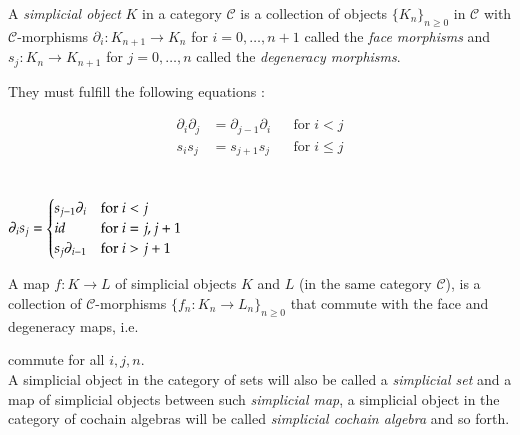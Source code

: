  \begin{Definition}
  A \emph{simplicial object} $K$ in a category $\mathscr{C}$
  is a collection of objects ${\lbrace K_n \rbrace}_{n \geq 0}$ in $\mathscr{C}$ with $\mathscr{C}$-morphisms
  $\partial_i \colon K_{n+1} \to K_n$ for $i = 0, \ldots, n+1$ called the \emph{face morphisms} and \newline
  $s_j \colon K_n \to K_{n+1}$ for $j = 0, \ldots, n$ called the \emph{degeneracy morphisms}.
  
  They must fulfill the following equations : 
%     
    \begin{multicols}{2}
     \begin{align*}
      \partial_i \partial_j &= \partial_{j-1} \partial_i & & \text{for} \; i < j \\
      s_i s_j &= s_{j+1} s_j & & \text{for} \; i \leq j
     \end{align*}
\columnbreak
\\ \\
      $\partial_i s_j = \begin{cases}
              s_{j-1} \partial_i 	&\text{for $i < j$} \\
              id 	&\text{for $i = j, j+1$} \\
              s_j \partial_{i-1}	 &\text{for $ i > j + 1$}
             
             \end{cases}
	      $
  \end{multicols}

    A map $f \colon K \to L$ of simplicial objects $K$ and $L$ (in the same category $\mathscr{C}$), is a collection
    of $\mathscr{C}$-morphisms ${\lbrace f_n \colon K_n \to L_n\rbrace }_{ n \geq 0}$ that commute with the face and degeneracy maps, i.e.\
    
  \centerline{
  }  
    
    commute for all $i,j,n$. \\
   A simplicial object in the category of sets will also be called a \emph{simplicial set} and a map 
   of simplicial objects between such \emph{simplicial map}, a simplicial object in the category of 
   cochain algebras will be called \emph{simplicial cochain algebra} and so forth.
  
 \end{Definition}

